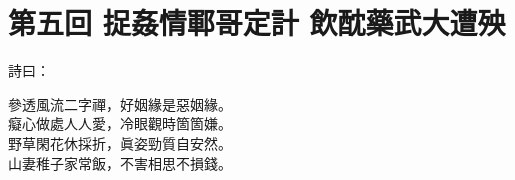 
\chapter*{第五回 捉姦情鄆哥定計 飲酖藥武大遭殃}


詩曰：

\begin{myquote} 
參透風流二字禪，好姻緣是惡姻緣。\\癡心做處人人愛，冷眼觀時箇箇嫌。\\野草閑花休採折，眞姿勁質自安然。\\山妻稚子家常飯，不害相思不損錢。
\end{myquote} 

